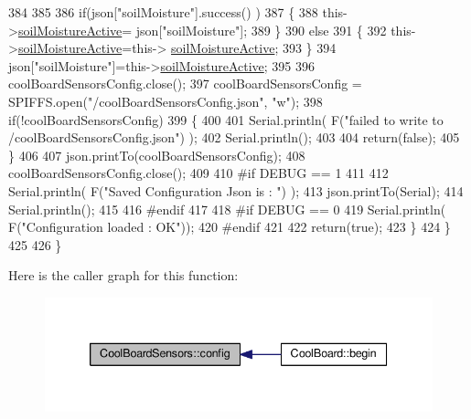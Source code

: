 \begin{DoxyCode}
384 
385             
386             \textcolor{keywordflow}{if}(json[\textcolor{stringliteral}{"soilMoisture"}].success() )
387             \{           
388                 this->\hyperlink{class_cool_board_sensors_a31983eecc0f9cd000e1f912206ea4dc8}{soilMoistureActive}= json[\textcolor{stringliteral}{"soilMoisture"}];
389             \}
390             \textcolor{keywordflow}{else}
391             \{
392                 this->\hyperlink{class_cool_board_sensors_a31983eecc0f9cd000e1f912206ea4dc8}{soilMoistureActive}=this->
      \hyperlink{class_cool_board_sensors_a31983eecc0f9cd000e1f912206ea4dc8}{soilMoistureActive};
393             \}
394             json[\textcolor{stringliteral}{"soilMoisture"}]=this->\hyperlink{class_cool_board_sensors_a31983eecc0f9cd000e1f912206ea4dc8}{soilMoistureActive};
395 
396             coolBoardSensorsConfig.close();         
397             coolBoardSensorsConfig = SPIFFS.open(\textcolor{stringliteral}{"/coolBoardSensorsConfig.json"}, \textcolor{stringliteral}{"w"});          
398             \textcolor{keywordflow}{if}(!coolBoardSensorsConfig)
399             \{
400 
401                 Serial.println( F(\textcolor{stringliteral}{"failed to write to /coolBoardSensorsConfig.json"}) );
402                 Serial.println();
403 
404                 \textcolor{keywordflow}{return}(\textcolor{keyword}{false});          
405             \}  
406 
407             json.printTo(coolBoardSensorsConfig);
408             coolBoardSensorsConfig.close();         
409             
410 \textcolor{preprocessor}{        #if DEBUG == 1}
411 
412             Serial.println( F(\textcolor{stringliteral}{"Saved Configuration Json is : "}) );
413             json.printTo(Serial);
414             Serial.println();
415         
416 \textcolor{preprocessor}{        #endif}
417 
418 \textcolor{preprocessor}{        #if DEBUG == 0}
419             Serial.println( F(\textcolor{stringliteral}{"Configuration loaded : OK"}));
420 \textcolor{preprocessor}{        #endif}
421 
422             \textcolor{keywordflow}{return}(\textcolor{keyword}{true}); 
423         \}
424     \}   
425 
426 \}
\end{DoxyCode}
Here is the caller graph for this function\+:\nopagebreak
\begin{figure}[H]
\begin{center}
\leavevmode
\includegraphics[width=339pt]{de/d46/class_cool_board_sensors_a9a218895c5423375c33c08f2c56fb23a_icgraph}
\end{center}
\end{figure}
\mbox{\label{class_cool_board_sensors_a4902b69f6e628bd6557193758fdd2bae}} 
